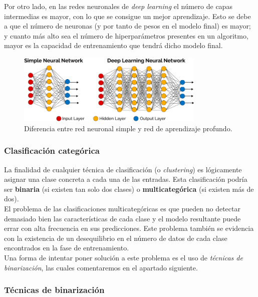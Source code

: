 \documentclass[]{article}
\begin{document}
		Por otro lado, en las redes neuronales de \textit{deep learning} el número de capas intermedias es mayor, con lo que se consigue un mejor aprendizaje. Esto se debe a que el número de neuronas (y por tanto de pesos en el modelo final) es mayor; y cuanto más alto sea el número de hiperparámetros presentes en un algoritmo, mayor es la capacidad de entrenamiento que tendrá dicho modelo final.\\
		
		\begin{figure}[h]
			\centering
			\includegraphics[width=0.8\textwidth]{./img/neural-network-differences}
			\caption{Diferencia entre red neuronal simple y red de aprendizaje profundo.}
			\label{nn-differences}
		\end{figure}
	
		\subsubsection*{Clasificación categórica}
		
			La finalidad de cualquier técnica de clasificación (o \textit{clustering}) es lógicamente asignar una clase concreta a cada una de las entradas. Esta clasificación podría ser \textbf{binaria} (si existen tan solo dos clases) o \textbf{multicategórica} (si existen más de dos).\\
			
			El problema de las clasificaciones multicategóricas es que pueden no detectar demasiado bien las características de cada clase y el modelo resultante puede errar con alta frecuencia en sus predicciones. Este problema también se evidencia con la existencia de un desequilibrio en el número de datos de cada clase encontrados en la fase de entrenamiento.\\
			
			Una forma de intentar poner solución a este problema es el uso de \textit{técnicas de binarización}, las cuales comentaremos en el apartado siguiente.
	
		\subsubsection{Técnicas de binarización}
		
\end{document}
